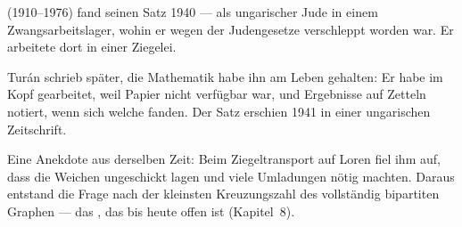 \begin{geschichte}
 (1910--1976) fand seinen Satz 1940 --- als ungarischer Jude in einem Zwangsarbeitslager, wohin er wegen der Judengesetze verschleppt worden war. Er arbeitete dort in einer Ziegelei.

Turán schrieb später, die Mathematik habe ihn am Leben gehalten: Er habe im Kopf gearbeitet, weil Papier nicht verfügbar war, und Ergebnisse auf Zetteln notiert, wenn sich welche fanden. Der Satz erschien 1941 in einer ungarischen Zeitschrift.

Eine Anekdote aus derselben Zeit: Beim Ziegeltransport auf Loren fiel ihm auf, dass die Weichen ungeschickt lagen und viele Umladungen nötig machten. Daraus entstand die Frage nach der kleinsten Kreuzungszahl des vollständig bipartiten Graphen --- das , das bis heute offen ist (Kapitel~8).

\begin{center}
\begin{minipage}{0.9\textwidth}
\end{minipage}
\end{center}
\end{geschichte}

